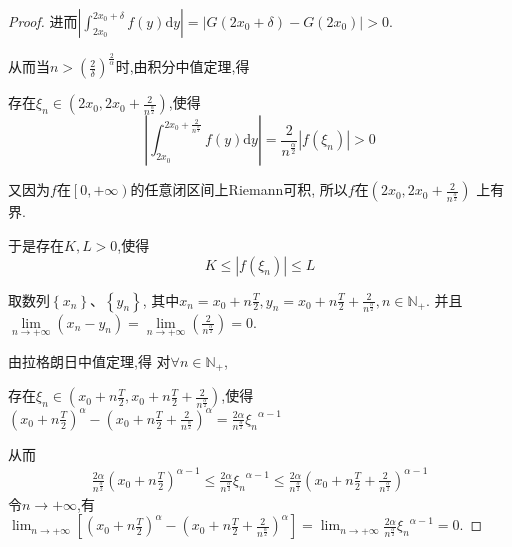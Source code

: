 \documentclass[lang=cn,newtx,10pt,scheme=chinese]{../Template/elegantbook}
\begin{document}
\begin{proof}
进而$\left| \int_{2x_0}^{2x_0+\delta}{f\left( y \right) \mathrm{d}y} \right|=\left| G\left( 2x_0+\delta \right) -G\left( 2x_0 \right) \right|>0$.

从而当$n>\left( \frac{2}{\delta} \right) ^{\frac{2}{\alpha}}$时,由积分中值定理,得

存在$\xi _n\in \left( 2x_0,2x_0+\frac{2}{n^{\frac{\alpha}{2}}} \right) $,使得
\begin{equation}\label{A}
\left| \int_{2x_0}^{2x_0+\frac{2}{n^{\frac{\alpha}{2}}}}{f\left( y \right) \mathrm{d}y} \right|=\frac{2}{n^{\frac{\alpha}{2}}}\left| f\left( \xi _n \right) \right|>0
\end{equation}

又因为$f$在$\left[ 0,+\infty \right)$的任意闭区间上Riemann可积,
所以$f$在$\left( 2x_0,2x_0+\frac{2}{n^{\frac{\alpha}{2}}} \right) $
上有界.

于是存在$K,L> 0$,使得
\begin{equation}\label{B}
K\leqslant \left| f\left( \xi _n \right) \right|\leqslant L
\end{equation}

取数列$\left\{ x_n \right\} \text{、}\left\{ y_n \right\} $,
其中$x_n=x_0+n\frac{T}{2},y_n=x_0+n\frac{T}{2}+\frac{2}{n^{\frac{\alpha}{2}}},n\in \mathbb{N} _+$.
并且$\underset{n\rightarrow +\infty}{\lim}\left( x_n-y_n \right) =\underset{n\rightarrow +\infty}{\lim}\left( \frac{2}{n^{\frac{\alpha}{2}}} \right) =0$.

由拉格朗日中值定理,得
对$\forall n\in \mathbb{N} _+$,

存在$\xi _n\in \left( x_0+n\frac{T}{2},x_0+n\frac{T}{2}+\frac{2}{n^{\frac{\alpha}{2}}} \right) $,使得
$\left( x_0+n\frac{T}{2} \right) ^{\alpha}-\left( x_0+n\frac{T}{2}+\frac{2}{n^{\frac{\alpha}{2}}} \right) ^{\alpha}=\frac{2\alpha}{n^{\frac{\alpha}{2}}}{\xi _n}^{\alpha -1}$

从而
\begin{equation}
\begin{split}
\frac{2\alpha}{n^{\frac{\alpha}{2}}}\left( x_0+n\frac{T}{2} \right) ^{\alpha -1}\leqslant \frac{2\alpha}{n^{\frac{\alpha}{2}}}{\xi _n}^{\alpha -1}\leqslant \frac{2\alpha}{n^{\frac{\alpha}{2}}}\left( x_0+n\frac{T}{2}+\frac{2}{n^{\frac{\alpha}{2}}} \right) ^{\alpha -1}
\end{split}
\nonumber
\end{equation}
令$n\rightarrow +\infty$,有$\lim_{n\rightarrow +\infty} \left[ \left( x_0+n\frac{T}{2} \right) ^{\alpha}-\left( x_0+n\frac{T}{2}+\frac{2}{n^{\frac{\alpha}{2}}} \right) ^{\alpha} \right] =\lim_{n\rightarrow +\infty} \frac{2\alpha}{n^{\frac{\alpha}{2}}}{\xi _n}^{\alpha -1}=0$.


\end{proof}
\end{document}
